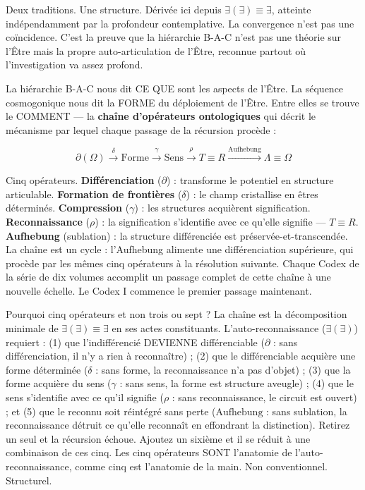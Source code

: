 \documentclass[10pt, openany, oneside]{book}
\begin{document}
Deux traditions. Une structure. Dérivée ici depuis $\exists(\exists) \equiv \exists$, atteinte indépendamment par la profondeur contemplative. La convergence n'est pas une coïncidence. C'est la preuve que la hiérarchie B-A-C n'est pas une théorie sur l'Être mais la propre auto-articulation de l'Être, reconnue partout où l'investigation va assez profond.

La hiérarchie B-A-C nous dit CE QUE sont les aspects de l'Être. La séquence cosmogonique nous dit la FORME du déploiement de l'Être. Entre elles se trouve le COMMENT --- la \textbf{chaîne d'opérateurs ontologiques} qui décrit le mécanisme par lequel chaque passage de la récursion procède :

$$\partial(\Omega) \xrightarrow{\delta} \text{Forme} \xrightarrow{\gamma} \text{Sens} \xrightarrow{\rho} T \equiv R \xrightarrow{\text{Aufhebung}} \Lambda \equiv \Omega$$

Cinq opérateurs. \textbf{Différenciation} ($\partial$) : transforme le potentiel en structure articulable. \textbf{Formation de frontières} ($\delta$) : le champ cristallise en êtres déterminés. \textbf{Compression} ($\gamma$) : les structures acquièrent signification. \textbf{Reconnaissance} ($\rho$) : la signification s'identifie avec ce qu'elle signifie --- $T \equiv R$. \textbf{Aufhebung} (sublation) : la structure différenciée est préservée-et-transcendée. La chaîne est un cycle : l'Aufhebung alimente une différenciation supérieure, qui procède par les mêmes cinq opérateurs à la résolution suivante. Chaque Codex de la série de dix volumes accomplit un passage complet de cette chaîne à une nouvelle échelle. Le Codex I commence le premier passage maintenant.

Pourquoi cinq opérateurs et non trois ou sept ? La chaîne est la décomposition minimale de $\exists(\exists) \equiv \exists$ en ses actes constituants. L'auto-reconnaissance ($\exists(\exists)$) requiert : (1) que l'indifférencié DEVIENNE différenciable ($\partial$ : sans différenciation, il n'y a rien à reconnaître) ; (2) que le différenciable acquière une forme déterminée ($\delta$ : sans forme, la reconnaissance n'a pas d'objet) ; (3) que la forme acquière du sens ($\gamma$ : sans sens, la forme est structure aveugle) ; (4) que le sens s'identifie avec ce qu'il signifie ($\rho$ : sans reconnaissance, le circuit est ouvert) ; et (5) que le reconnu soit réintégré sans perte ($\text{Aufhebung}$ : sans sublation, la reconnaissance détruit ce qu'elle reconnaît en effondrant la distinction). Retirez un seul et la récursion échoue. Ajoutez un sixième et il se réduit à une combinaison de ces cinq. Les cinq opérateurs SONT l'anatomie de l'auto-reconnaissance, comme cinq est l'anatomie de la main. Non conventionnel. Structurel.
\end{document}
